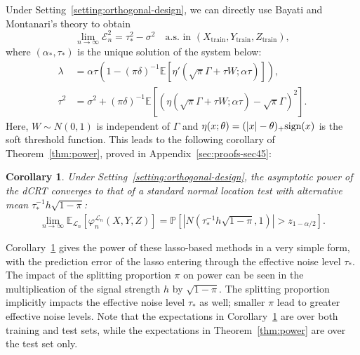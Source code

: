 \documentclass[12pt]{article}
\newtheorem{corollary}{Corollary}
\theoremstyle{definition}
\theoremstyle{remark}
\newcommand{\srx}{X}
\newcommand{\srz}{Z}
\newcommand{\sry}{Y}
\begin{document}
Under Setting~\ref{setting:orthogonal-design}, we can directly use Bayati and Montanari's theory \cite{Bayati2011} to obtain 
\begin{equation}
\lim_{n \rightarrow \infty}\mathcal E_n^2 = \tau_*^2 - \sigma^2 \quad \text{a.s. in } (\srx_{\text{train}}, \sry_{\text{train}}, \srz_{\text{train}}),
\label{eq:bm-result}
\end{equation}
where $(\alpha_*,\tau_*)$ is the unique solution of the system below:
\begin{equation}
	\begin{split}
		\lambda &= \alpha \tau (1-(\pi\delta)^{-1}\mathbb E[\eta'(\sqrt \pi \Gamma + \tau W; \alpha \tau)]), \\
		\tau^2 &= \sigma^2 + (\pi\delta)^{-1}\mathbb E[(\eta(\sqrt \pi\Gamma + \tau W; \alpha \tau) - \sqrt \pi\Gamma)^2].
	\end{split}
	\label{eq:amp-system}
\end{equation}
Here, $W \sim N(0,1)$ is independent of $\Gamma$ and $\eta(x; \theta) = (|x|-\theta)_+\textnormal{sign}(x)$ is the soft threshold function. This leads to the following corollary of Theorem~\ref{thm:power}, proved in Appendix~\ref{sec:proofs-sec45}:
\begin{corollary} \label{cor:lasso}
Under Setting~\ref{setting:orthogonal-design}, the asymptotic power of the dCRT converges to that of a standard normal location test with alternative mean $\tau_*^{-1} h\sqrt{1-\pi}$:
\begin{equation}
	\begin{split}
	\lim_{n \rightarrow \infty}\mathbb E_{\mathcal L_n}[\varphi^{\mathcal L_n}_{n}(\srx, \sry, \srz)] =  \mathbb P[|N(\tau_*^{-1} h\sqrt{1-\pi},1)| > z_{1-\alpha/2}].
	\label{eq:lasso-power}
	\end{split}
\end{equation}
\end{corollary}
Corollary~\ref{cor:lasso} gives the power of these lasso-based methods in a very simple form, with the prediction error of the lasso entering through the effective noise level $\tau_*$. The impact of the splitting proportion $\pi$ on power can be seen in the multiplication of the signal strength $h$ by $\sqrt{1-\pi}$. The splitting proportion implicitly impacts the effective noise level $\tau_*$ as well; smaller $\pi$ lead to greater effective noise levels. Note that the expectations in Corollary~\ref{cor:lasso} are over both training and test sets, while the expectations in Theorem~\ref{thm:power} are over the test set only. 
\end{document}
